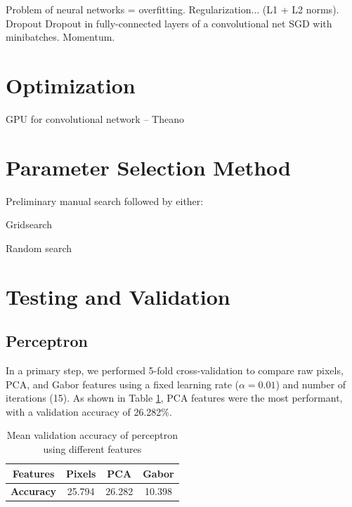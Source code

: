 \documentclass{acm_proc_article-sp}
\begin{document}
Problem of neural networks = overfitting. Regularization... (L1 + L2 norms). Dropout \cite{Hinton}
Dropout in fully-connected layers of a convolutional net \cite{Krizhevsky}
SGD with minibatches.
Momentum.


\section{Optimization} %
GPU for convolutional network -- Theano \cite{Theano}

\section{Parameter Selection Method}%
Preliminary manual search followed by either:

Gridsearch 

Random search \cite{Bergstra}

\section{Testing and Validation}%

\subsection{Perceptron}
In a primary step, we performed 5-fold cross-validation to compare raw pixels, PCA, and Gabor features using a fixed learning rate ($\alpha = 0.01$) and number of iterations (15). As shown in Table \ref{tab:perc-features}, PCA features were the most performant, with a validation accuracy of 26.282\%.
\begin{table}[h!]
  \centering
  \begin{tabular}{|c||c|c|c| }
    \hline
    {\bfseries Features} & Pixels & PCA & Gabor \\
    \hline
    {\bfseries Accuracy} & 25.794 & 26.282 & 10.398 \\
    \hline
  \end{tabular}
  \caption{Mean validation accuracy of perceptron using different features}
  \label{tab:perc-features}
\end{table}
\end{document}
